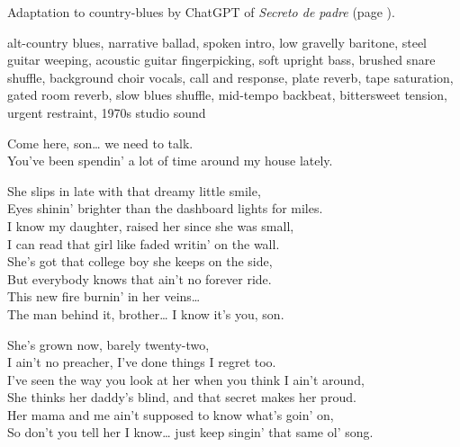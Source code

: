 
\begin{notes}
Adaptation to country-blues by ChatGPT of \emph{Secreto de padre} (page \pageref{sec:secreto-de-padre}).
\end{notes}
\begin{style}
alt-country blues, narrative ballad, spoken intro, low gravelly baritone, steel guitar weeping, acoustic guitar fingerpicking, soft upright bass, brushed snare shuffle, background choir vocals, call and response, plate reverb, tape saturation, gated room reverb, slow blues shuffle, mid-tempo backbeat, bittersweet tension, urgent restraint, 1970s studio sound
\end{style}
\begin{lyrics}
Come here, son… we need to talk.\\
You’ve been spendin’ a lot of time around my house lately.

She slips in late with that dreamy little smile,\\
Eyes shinin’ brighter than the dashboard lights for miles.\\
I know my daughter, raised her since she was small,\\
I can read that girl like faded writin’ on the wall.\\
She’s got that college boy she keeps on the side,\\
But everybody knows that ain’t no forever ride.\\
This new fire burnin’ in her veins…\\
The man behind it, brother… I know it’s you, son.

She’s grown now, barely twenty-two,\\
I ain’t no preacher, I’ve done things I regret too.\\
I’ve seen the way you look at her when you think I ain’t around,\\
She thinks her daddy’s blind, and that secret makes her proud.\\
Her mama and me ain’t supposed to know what’s goin’ on,\\
So don’t you tell her I know… just keep singin’ that same ol’ song.


\end{lyrics}
